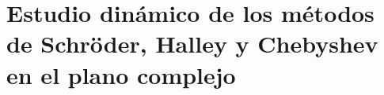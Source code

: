 \chapter{Estudio dinámico de los métodos de Schröder, Halley y Chebyshev en el plano complejo}
\label{cap:plano_complejo}





